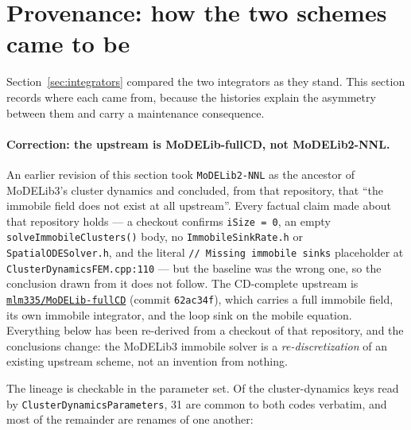 \documentclass[11pt,a4paper]{article}
\newcommand{\code}[1]{\texttt{\small #1}}
\begin{document}
\section{Provenance: how the two schemes came to be}
\label{sec:provenance}

Section~\ref{sec:integrators} compared the two integrators as they stand. This
section records where each came from, because the histories explain the
asymmetry between them and carry a maintenance consequence.

\paragraph{Correction: the upstream is MoDELib-fullCD, not MoDELib2-NNL.}
An earlier revision of this section took \code{MoDELib2-NNL} as the ancestor of
MoDELib3's cluster dynamics and concluded, from that repository, that ``the
immobile field does not exist at all upstream''. Every factual claim made about
that repository holds --- a checkout confirms \code{iSize = 0}, an empty
\code{solveImmobileClusters()} body, no \code{ImmobileSinkRate.h} or
\code{SpatialODESolver.h}, and the literal \code{// Missing immobile sinks}
placeholder at \code{ClusterDynamicsFEM.cpp:110} --- but the baseline was the
wrong one, so the conclusion drawn from it does not follow. The CD-complete
upstream is
\href{https://github.com/mlm335/MoDELib-fullCD}{\code{mlm335/MoDELib-fullCD}}
(commit \code{62ac34f}), which carries a full immobile field, its own immobile
integrator, and the loop sink on the mobile equation. Everything below has been
re-derived from a checkout of that repository, and the conclusions change: the
MoDELib3 immobile solver is a \emph{re-discretization} of an existing upstream
scheme, not an invention from nothing.

The lineage is checkable in the parameter set. Of the cluster-dynamics keys read
by \code{ClusterDynamicsParameters}, 31 are common to both codes verbatim, and
most of the remainder are renames of one another:
\end{document}
